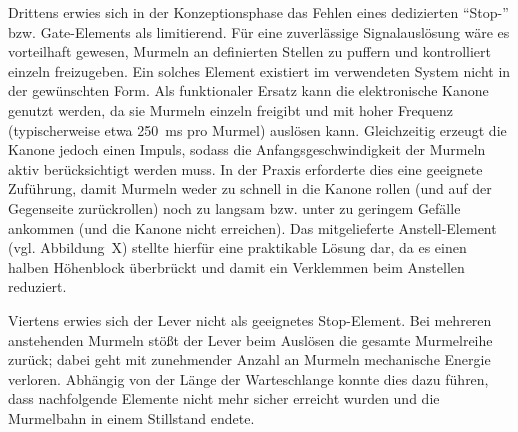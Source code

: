 Drittens erwies sich in der Konzeptionsphase das Fehlen eines dedizierten ``Stop-'' bzw. Gate-Elements als limitierend. Für eine zuverlässige Signalauslösung wäre es vorteilhaft gewesen, Murmeln an definierten Stellen zu puffern und kontrolliert einzeln freizugeben. Ein solches Element existiert im verwendeten System nicht in der gewünschten Form. Als funktionaler Ersatz kann die elektronische Kanone genutzt werden, da sie Murmeln einzeln freigibt und mit hoher Frequenz (typischerweise etwa 250~ms pro Murmel) auslösen kann. Gleichzeitig erzeugt die Kanone jedoch einen Impuls, sodass die Anfangsgeschwindigkeit der Murmeln aktiv berücksichtigt werden muss. In der Praxis erforderte dies eine geeignete Zuführung, damit Murmeln weder zu schnell in die Kanone rollen (und auf der Gegenseite zurückrollen) noch zu langsam bzw. unter zu geringem Gefälle ankommen (und die Kanone nicht erreichen). Das mitgelieferte Anstell-Element (vgl. Abbildung~X) stellte hierfür eine praktikable Lösung dar, da es einen halben Höhenblock überbrückt und damit ein Verklemmen beim Anstellen reduziert.

Viertens erwies sich der Lever nicht als geeignetes Stop-Element. Bei mehreren anstehenden Murmeln stößt der Lever beim Auslösen die gesamte Murmelreihe zurück; dabei geht mit zunehmender Anzahl an Murmeln mechanische Energie verloren. Abhängig von der Länge der Warteschlange konnte dies dazu führen, dass nachfolgende Elemente nicht mehr sicher erreicht wurden und die Murmelbahn in einem Stillstand endete.

